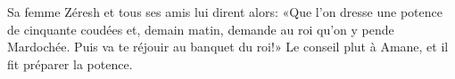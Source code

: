 Sa femme Zéresh et tous ses amis lui dirent alors:
	«Que l’on dresse une potence de cinquante coudées
	et, demain matin, demande au roi qu’on y pende Mardochée.
	Puis va te réjouir au banquet du roi!»
Le conseil plut à Amane, et il fit préparer la potence.
